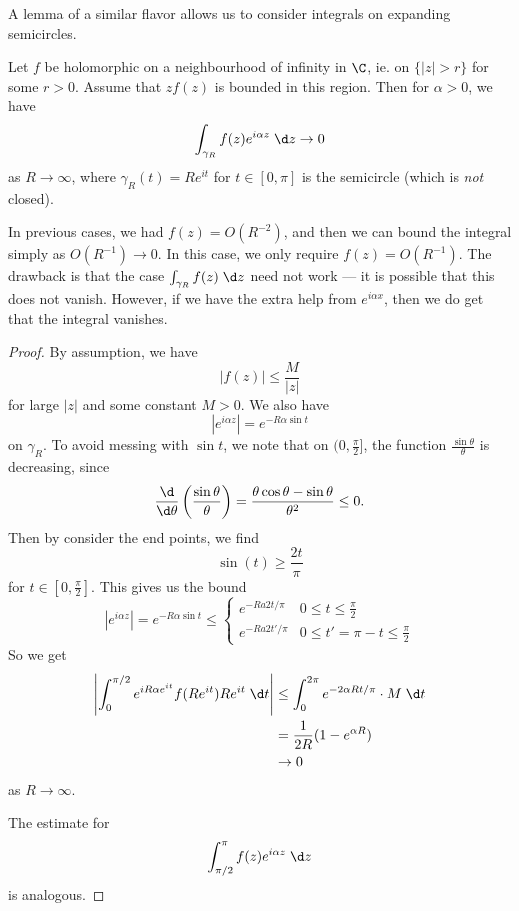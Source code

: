 \documentclass[a4paper]{article}
\begin{document}
A lemma of a similar flavor allows us to consider integrals on expanding semicircles.
\begin{lemma}
  Let $f$ be holomorphic on a neighbourhood of infinity in $\C$, ie. on $\{|z| > r\}$ for some $r > 0$. Assume that $zf(z)$ is bounded in this region. Then for $\alpha > 0$, we have
  \[
    \int_{\gamma_R} f(z) e^{i\alpha z}\;\d z \to 0
  \]
  as $R \to \infty$, where $\gamma_R(t) = Re^{it}$ for $t \in [0, \pi]$ is the semicircle (which is \emph{not} closed).
  \begin{center}
  \end{center}
\end{lemma}
In previous cases, we had $f(z) = O(R^{-2})$, and then we can bound the integral simply as $O(R^{-1}) \to 0$. In this case, we only require $f(z) = O(R^{-1})$. The drawback is that the case $\int_{\gamma_R}f(z)\;\d z$ need not work --- it is possible that this does not vanish. However, if we have the extra help from $e^{i\alpha x}$, then we do get that the integral vanishes.

\begin{proof}
  By assumption, we have
  \[
    |f(z)| \leq \frac{M}{|z|}
  \]
  for large $|z|$ and some constant $M > 0$. We also have
  \[
    |e^{i \alpha z}| = e^{-R\alpha \sin t}
  \]
on $\gamma_R$. To avoid messing with $\sin t$, we note that on $(0, \frac{\pi}{2}]$, the function $\frac{\sin \theta}{\theta}$ is decreasing, since
\[
  \frac{\d}{\d \theta} \left(\frac{\sin \theta}{\theta}\right) = \frac{\theta \cos \theta - \sin \theta}{\theta^2} \leq 0.
\]
Then by consider the end points, we find
\[
  \sin(t) \geq \frac{2t}{\pi}
\]
for $t \in [0, \frac{\pi}{2}]$. This gives us the bound
\[
  |e^{i\alpha z}| = e^{-R\alpha \sin t} \leq
  \begin{cases}
    e^{-Ra2t/\pi} & 0 \leq t \leq \frac{\pi}{2}\\
    e^{-Ra2t'/\pi} & 0 \leq t' = \pi - t \leq \frac{\pi}{2}
  \end{cases}
\]
So we get
\begin{align*}
  \left|\int_0^{\pi/2} e^{iR\alpha e^{it}} f(Re^{it}) Re^{it}\;\d t\right| &\leq \int_0^{2\pi} e^{-2\alpha Rt/\pi} \cdot M \;\d t\\
  &= \frac{1}{2R} (1 - e^{\alpha R})\\
  &\to 0
\end{align*}
as $R \to \infty$.

The estimate for
\[
  \int_{\pi/2}^\pi f(z) e^{i\alpha z}\;\d z
\]
is analogous.
\end{proof}
\end{document}
